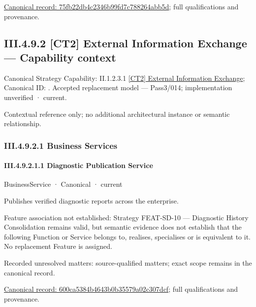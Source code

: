 {\footnotesize \href{../../../../../../../continuum/business/business-function/75fb22db4c2346b99fd7c788264abb5d.md}{Canonical record: 75fb22db4c2346b99fd7c788264abb5d}; full qualifications and provenance.}\par
\subsection*{III.4.9.2 [CT2] External Information Exchange — Capability context}
\label{navigation:III.4.9.2}

{\small Canonical Strategy Capability: II.1.2.3.1 \hyperref[element:883265005129434382aa86d2bcadb989]{[CT2] External Information Exchange}; Canonical ID: \texttt{}. Accepted replacement model — Pass3/014; implementation unverified · current.}\par
Contextual reference only; no additional architectural instance or semantic relationship.\par
\subsubsection*{III.4.9.2.1 Business Services}
\label{navigation:III.4.9.2.1}

\paragraph*{III.4.9.2.1.1 Diagnostic Publication Service}
\label{navigation:III.4.9.2.1.1}

\label{element:600ca5384b4643b0b35579a02c307dcf}
{\small BusinessService · Canonical · current}\par

Publishes verified diagnostic reports across the enterprise.



Feature association not established: Strategy FEAT-SD-10 — Diagnostic History Consolidation remains valid, but semantic evidence does not establish that the following Function or Service belongs to, realises, specialises or is equivalent to it. No replacement Feature is assigned.


{\small Recorded unresolved matters: source-qualified matters; exact scope remains in the canonical record.}\par
{\footnotesize \href{../../../../../../../continuum/business/business-service/600ca5384b4643b0b35579a02c307dcf.md}{Canonical record: 600ca5384b4643b0b35579a02c307dcf}; full qualifications and provenance.}\par
